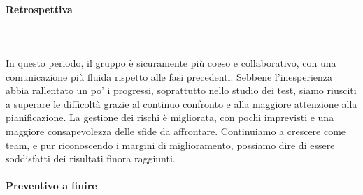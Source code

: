\paragraph{Retrospettiva} \hspace{1cm} 
\\ \hspace{1cm} \\
In questo periodo, il gruppo è sicuramente più coeso e collaborativo, con una comunicazione più fluida rispetto alle fasi precedenti. Sebbene l’inesperienza abbia rallentato un po' i progressi, soprattutto nello studio dei test, siamo riusciti a superare le difficoltà grazie al continuo confronto e alla maggiore attenzione alla pianificazione. La gestione dei rischi è migliorata, con pochi imprevisti e una maggiore consapevolezza delle sfide da affrontare. Continuiamo a crescere come team, e pur riconoscendo i margini di miglioramento, possiamo dire di essere soddisfatti dei risultati finora raggiunti.

\paragraph{Preventivo a finire} \hspace{1cm}

\begin{table}[H]
\centering
{}
\caption{Preventivo a finire dopo la retrospettiva sul periodo VII}
\end{table}

